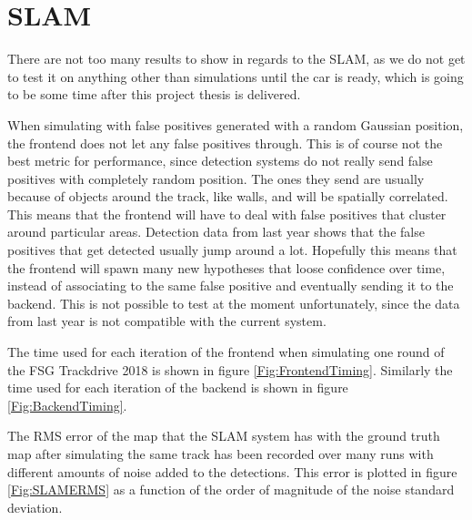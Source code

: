 \section{SLAM}

There are not too many results to show in regards to the SLAM, as we do not get to test it on anything other than simulations until the car is ready, which is going to be some time after this project thesis is delivered. 

When simulating with false positives generated with a random Gaussian position, the frontend does not let any false positives through. This is of course not the best metric for performance, since detection systems do not really send false positives with completely random position. The ones they send are usually because of objects around the track, like walls, and will be spatially correlated. This means that the frontend will have to deal with false positives that cluster around particular areas. Detection data from last year shows that the false positives that get detected usually jump around a lot. Hopefully this means that the frontend will spawn many new hypotheses that loose confidence over time, instead of associating to the same false positive and eventually sending it to the backend. This is not possible to test at the moment unfortunately, since the data from last year is not compatible with the current system. 

The time used for each iteration of the frontend when simulating one round of the \gls{FSG} Trackdrive 2018 is shown in figure \ref{Fig:FrontendTiming}. Similarly the time used for each iteration of the backend is shown in figure \ref{Fig:BackendTiming}. 

The \gls{RMS} error of the map that the \gls{SLAM} system has with the ground truth map after simulating the same track has been recorded over many runs with different amounts of noise added to the detections. This error is plotted in figure \ref{Fig:SLAMERMS} as a function of the order of magnitude of the noise standard deviation.

\FloatBarrier

